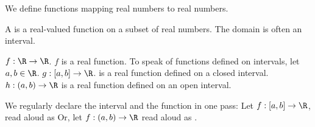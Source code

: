 

We define functions mapping
real numbers to real numbers.


A
is a real-valued function
on
a subset of real numbers.
The domain
is often an
interval.


$f: \R \to \R$. $f$ is a real
function.
To speak of functions defined
on intervals,
let $a, b \in \R$.
$g: [a, b] \to \R$.
is a real function
defined on a closed interval.
$h: (a, b) \to \R$
is a real function
defined on an open interval.

We regularly declare the interval
and the function in one pass:
Let $f: [a, b] \to \R$, read
aloud as 
Or, let $f: (a, b) \to \R$
read aloud as
.
